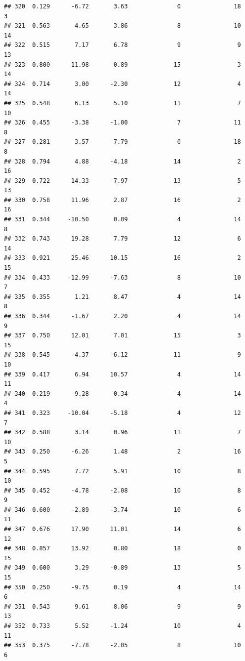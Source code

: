 \documentclass[]{book}
\begin{document}
\begin{verbatim}
## 320  0.129      -6.72       3.63              0               18        3
## 321  0.563       4.65       3.86              8               10       14
## 322  0.515       7.17       6.78              9                9       13
## 323  0.800      11.98       0.89             15                3       14
## 324  0.714       3.00      -2.30             12                4       14
## 325  0.548       6.13       5.10             11                7       10
## 326  0.455      -3.38      -1.00              7               11        8
## 327  0.281       3.57       7.79              0               18        8
## 328  0.794       4.88      -4.18             14                2       16
## 329  0.722      14.33       7.97             13                5       13
## 330  0.758      11.96       2.87             16                2       16
## 331  0.344     -10.50       0.09              4               14        8
## 332  0.743      19.28       7.79             12                6       14
## 333  0.921      25.46      10.15             16                2       15
## 334  0.433     -12.99      -7.63              8               10        7
## 335  0.355       1.21       8.47              4               14        8
## 336  0.344      -1.67       2.20              4               14        9
## 337  0.750      12.01       7.01             15                3       15
## 338  0.545      -4.37      -6.12             11                9       10
## 339  0.417       6.94      10.57              4               14       11
## 340  0.219      -9.28       0.34              4               14        4
## 341  0.323     -10.04      -5.18              4               12        7
## 342  0.588       3.14       0.96             11                7       10
## 343  0.250      -6.26       1.48              2               16        5
## 344  0.595       7.72       5.91             10                8       10
## 345  0.452      -4.78      -2.08             10                8        9
## 346  0.600      -2.89      -3.74             10                6       11
## 347  0.676      17.90      11.01             14                6       12
## 348  0.857      13.92       0.80             18                0       15
## 349  0.600       3.29      -0.89             13                5       15
## 350  0.250      -9.75       0.19              4               14        6
## 351  0.543       9.61       8.06              9                9       13
## 352  0.733       5.52      -1.24             10                4       11
## 353  0.375      -7.78      -2.05              8               10        6

\end{verbatim}
\end{document}
